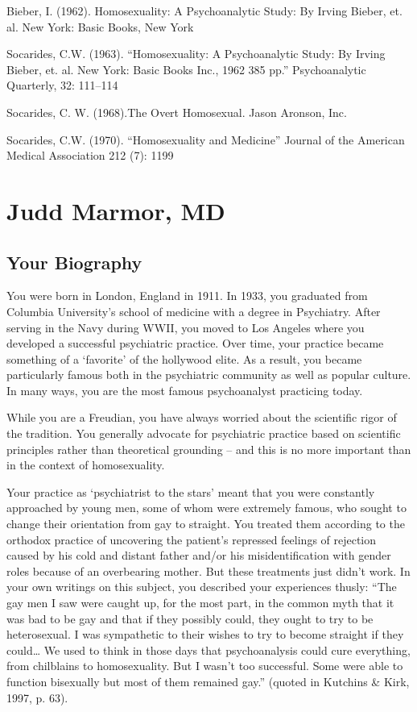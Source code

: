 Bieber, I. (1962). Homosexuality: A Psychoanalytic Study: By Irving Bieber, et. al. New York: Basic Books, New York

Socarides, C.W. (1963). ``Homosexuality: A Psychoanalytic Study: By Irving Bieber, et. al. New York: Basic Books Inc., 1962 385 pp.'' Psychoanalytic Quarterly, 32: 111--114

Socarides, C. W. (1968).The Overt Homosexual. Jason Aronson, Inc.

Socarides, C.W. (1970). ``Homosexuality and Medicine'' Journal of the American Medical Association 212 (7): 1199

\chapter{Judd Marmor, MD}
\label{juddmarmormd}

\section{Your Biography}
\label{yourbiography}

You were born in London, England in 1911. In 1933, you graduated from Columbia University's school of medicine with a degree in Psychiatry. After serving in the Navy during WWII, you moved to Los Angeles where you developed a successful psychiatric practice. Over time, your practice became something of a `favorite' of the hollywood elite. As a result, you became particularly famous both in the psychiatric community as well as popular culture. In many ways, you are the most famous psychoanalyst practicing today.

While you are a Freudian, you have always worried about the scientific rigor of the tradition. You generally advocate for psychiatric practice based on scientific principles rather than theoretical grounding – and this is no more important than in the context of homosexuality.

Your practice as `psychiatrist to the stars' meant that you were constantly approached by young men, some of whom were extremely famous, who sought to change their orientation from gay to straight. You treated them according to the orthodox practice of uncovering the patient's repressed feelings of rejection caused by his cold and distant father and\slash or his misidentification with gender roles because of an overbearing mother. But these treatments just didn't work. In your own writings on this subject, you described your experiences thusly: ``The gay men I saw were caught up, for the most part, in the common myth that it was bad to be gay and that if they possibly could, they ought to try to be heterosexual. I was sympathetic to their wishes to try to become straight if they could{\ldots} We used to think in those days that psychoanalysis could cure everything, from chilblains to homosexuality. But I wasn't too successful. Some were able to function bisexually but most of them remained gay.'' (quoted in Kutchins \& Kirk, 1997, p. 63).

